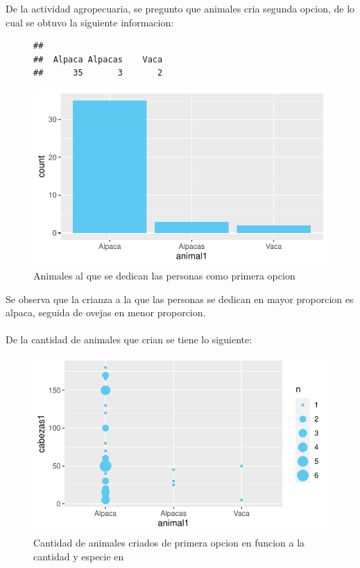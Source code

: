 \documentclass[12pt]{article}\usepackage[]{graphicx}\usepackage[]{xcolor}
\makeatletter
\def\maxwidth{ %
  \ifdim\Gin@nat@width>\linewidth
    \linewidth
  \else
    \Gin@nat@width
  \fi
}
\newenvironment{kframe}{%
 \def\at@end@of@kframe{}%
 \ifinner\ifhmode%
  \def\at@end@of@kframe{\end{minipage}}%
  \begin{minipage}{\columnwidth}%
 \fi\fi%
 \def\FrameCommand##1{\hskip\@totalleftmargin \hskip-\fboxsep
 \colorbox{shadecolor}{##1}\hskip-\fboxsep
     \hskip-\linewidth \hskip-\@totalleftmargin \hskip\columnwidth}%
 \MakeFramed {\advance\hsize-\width
   \@totalleftmargin\z@ \linewidth\hsize
   \@setminipage}}%
 {\par\unskip\endMakeFramed%
 \at@end@of@kframe}
\newenvironment{knitrout}{}{} %
\makeatother
\begin{document}
	
	De la actividad agropecuaria, se pregunto que animales cria segunda opcion, de lo cual se obtuvo la siguiente informacion:
	\begin{figure}[H]
	\centering
\begin{knitrout}
\color{fgcolor}\begin{kframe}
\begin{verbatim}
## 
##  Alpaca Alpacas    Vaca 
##      35       3       2
\end{verbatim}
\end{kframe}
\includegraphics[width=\maxwidth]{figure/fifteen-1} 
\end{knitrout}
	\caption{Animales al que se dedican las personas como primera opcion}
	\end{figure}
	Se observa que la crianza a la que las personas se dedican en mayor proporcion es alpaca, seguida de ovejas en menor proporcion.\\
	\\
	De la cantidad de animales que crian se tiene lo siguiente:
	\begin{figure}[H]
	\centering
\begin{knitrout}
\color{fgcolor}
\includegraphics[width=\maxwidth]{figure/sixteen-1} 
\end{knitrout}
	\caption{Cantidad de animales criados de primera opcion en funcion a la cantidad y especie en \comunidad}
	\end{figure}
	
\end{document}
